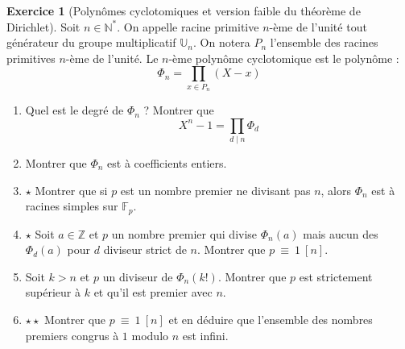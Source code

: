 \documentclass[french]{article}
\newcommand{\N}{\mathbb{N}}
\newcommand{\Z}{\mathbb{Z}}
\newcommand{\U}{\mathbb{U}}
\newcommand{\st}{^*}
\newcommand{\F}{\mathbb{F}}
\theoremstyle{definition}
\newtheorem{exo}{Exercice}
\begin{document}
\begin{exo}[Polynômes cyclotomiques et version faible du théorème de Dirichlet]
	Soit $n\in\N\st$. On appelle racine primitive $n$-ème de l'unité tout générateur du groupe multiplicatif $\U_n$. On notera $P_n$ l'ensemble des racines primitives $n$-ème de l'unité. Le $n$-ème polynôme cyclotomique est le polynôme : $$\Phi_n=\prod_{x\in P_n}(X-x)$$
	\begin{enumerate}
		\item Quel est le degré de $\Phi_n$ ? Montrer que $$X^n-1=\prod_{d\mid n}\Phi_d$$
		\item Montrer que $\Phi_n$ est à coefficients entiers.
		\item $\star$ Montrer que si $p$ est un nombre premier ne divisant pas $n$, alors $\Phi_n$ est à racines simples sur $\F_p$.
		\item $\star$ Soit $a\in\Z$ et $p$ un nombre premier qui divise $\Phi_n(a)$ mais aucun des $\Phi_d(a)$ pour $d$ diviseur strict de $n$. Montrer que $p\ \equiv\ 1\ [n]$.
		\item Soit $k>n$ et $p$ un diviseur de $\Phi_n(k!)$. Montrer que $p$ est strictement supérieur à $k$ et qu'il est premier avec $n$.
		\item $\star\star$ Montrer que $p\ \equiv\ 1\ [n]$ et en déduire que l'ensemble des nombres premiers congrus à $1$ modulo $n$ est infini.
	\end{enumerate}
\end{exo}
\end{document}
